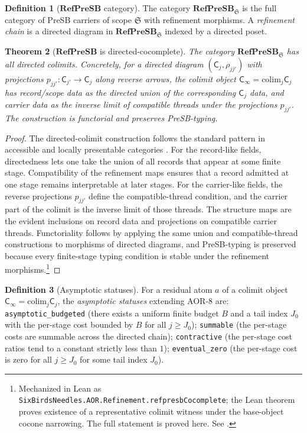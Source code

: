 \documentclass[11pt]{article}
\newcommand{\RefPreSB}{\mathbf{RefPreSB}}
\newtheorem{theorem}{Theorem}[section]
\theoremstyle{definition}
\newtheorem{definition}[theorem]{Definition}
\begin{document}
\begin{definition}[$\RefPreSB$ category]\label{def:aor:refpresb-category}
The category $\RefPreSB_{\mathfrak S}$ is the full category of PreSB
carriers of scope $\mathfrak S$ with refinement morphisms.  A
\emph{refinement chain} is a directed diagram in
$\RefPreSB_{\mathfrak S}$ indexed by a directed poset.
\end{definition}

\begin{theorem}[$\RefPreSB$ is directed-cocomplete]\label{thm:aor:refpresb-cocomplete}
The category $\RefPreSB_{\mathfrak S}$ has all directed colimits.
Concretely, for a directed diagram
$(\mathsf C_j,\rho_{jj'})$ with projections
$p_{jj'}:\mathsf C_{j'}\to\mathsf C_j$ along reverse arrows, the
colimit object $\mathsf C_\infty=\mathrm{colim}_j\mathsf C_j$ has
record/scope data as the directed union of the corresponding $\mathsf
C_j$ data, and carrier data as the inverse limit of compatible threads
under the projections $p_{jj'}$.  The construction is functorial and
preserves PreSB-typing.
\end{theorem}

\begin{proof}
The directed-colimit construction follows the standard pattern in
accessible and locally presentable categories
\citep{AdamekRosicky1994LocallyPresentable,MacLane1998Categories}.  For
the record-like fields, directedness lets one take the union of all
records that appear at some finite stage.  Compatibility of the
refinement maps ensures that a record admitted at one stage remains
interpretable at later stages.  For the carrier-like fields, the
reverse projections \(p_{jj'}\) define the compatible-thread condition,
and the carrier part of the colimit is the inverse limit of those
threads.  The structure maps are the evident inclusions on record data
and projections on compatible carrier threads.  Functoriality follows
by applying the same union and compatible-thread constructions to
morphisms of directed diagrams, and PreSB-typing is preserved because
every finite-stage typing condition is stable under the refinement
morphisms.\footnote{Mechanized in Lean as \texttt{SixBirdsNeedles.AOR.Refinement.refpresbCocomplete}; the Lean theorem proves existence of a representative colimit witness under the base-object cocone narrowing. The full statement is proved here. See .}
\end{proof}

\begin{definition}[Asymptotic statuses]\label{def:aor:asymptotic-statuses}
For a residual atom $a$ of a colimit object
$\mathsf C_\infty=\mathrm{colim}_j\mathsf C_j$, the
\emph{asymptotic statuses} extending AOR-8 are:
\texttt{asymptotic\_budgeted} (there exists a uniform finite budget
$B$ and a tail index $J_0$ with the per-stage cost bounded by $B$ for
all $j\ge J_0$);
\texttt{summable} (the per-stage costs are summable across the
directed chain);
\texttt{contractive} (the per-stage cost ratios tend to a constant
strictly less than $1$);
\texttt{eventual\_zero} (the per-stage cost is zero for all $j\ge J_0$
for some tail index $J_0$).
\end{definition}
\end{document}
